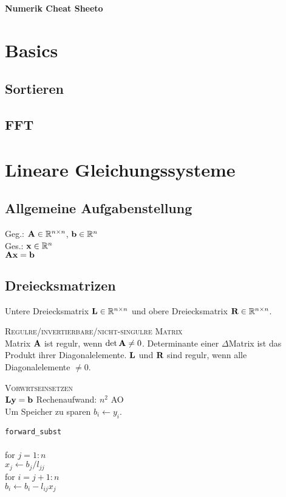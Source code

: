\begin{center}
     \Large{\textbf{Numerik Cheat Sheeto}} \\
\end{center}

\section{Basics}
\subsection{Sortieren}
\subsection{FFT}

\section{Lineare Gleichungssysteme}
\subsection{Allgemeine Aufgabenstellung}
Geg.: $\mbox{\bf A} \in \mathbb{R}^{n \times n}$, $\mbox{\bf b} \in \mathbb{R}^{n}$ \\
Ges.: $\mbox{\bf x} \in \mathbb{R}^{n}$ \\
\centering $\mbox{\bf Ax}=\mbox{\bf b}$ \flushleft
\subsection{Dreiecksmatrizen}
Untere Dreiecksmatrix $\mbox{\bf L} \in \mathbb{R}^{n \times n}$ und obere Dreiecksmatrix $\mbox{\bf R} \in \mathbb{R}^{n \times n}$.\vspace{0.2cm}

\textsc{Regul\a re/invertierbare/nicht-singul\a re Matrix}\\
Matrix $\mbox{\bf A}$ ist regul\a r, wenn $\det \mbox{\bf A}\neq 0$. Determinante einer $\Delta$Matrix ist das Produkt ihrer Diagonalelemente. $\mbox{\bf L}$ und $\mbox{\bf R}$ sind regul\a r, wenn alle Diagonalelemente $\neq 0$.\vspace{0.2cm}

\textsc{Vorw\a rtseinsetzen}\\
\centering $\mbox{\bf Ly}=\mbox{\bf b}$ \flushleft
Rechenaufwand: $n^2$ AO \\
Um Speicher zu sparen  $b_i \leftarrow y_i$.\vspace{0.2cm}

\verb!forward_subst!\\
{\addtolength{\leftskip}{0mm}
\hrulefill\\
for $j=1:n$\\
\quad $x_j \leftarrow b_j/l_{jj}$\\
\quad for $i=j+1:n$\\
\qquad $b_i \leftarrow b_i-l_{ij}x_j$\\
\hrulefill\\
}\vspace{0.2cm}

